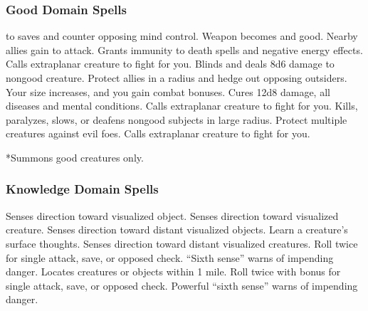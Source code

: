 \subsubsection{Good Domain Spells}

\begin{spelllist}
  \spellhead[1]{}
    to saves and counter opposing mind control.
   Weapon becomes  and good.
   Nearby allies gain  to attack.
   Grants immunity to death spells and negative energy effects.
   Calls extraplanar creature to fight for you.
  \spellhead[4]{}
   Blinds and deals 8d6 damage to nongood creature.
   Protect allies in a \areamed radius and hedge out opposing outsiders.
   Your size increases, and you gain combat bonuses.
   Cures 12d8 damage, all diseases and mental conditions.
   Calls extraplanar creature to fight for you.
  \F Kills, paralyzes, slows, or deafens nongood subjects in large radius.
  \spellhead[7]{}
  \spellhead[8]{}
   Protect multiple creatures against evil foes. 
  \spellhead[9]{}
   Calls extraplanar creature to fight for you.
\end{spelllist}
*Summons good creatures only.

\subsubsection{Knowledge Domain Spells}

\begin{spelllist}
   Senses direction toward visualized object.
  \spellhead[1]{}
   Senses direction toward visualized creature.
  \spellhead[2]{}
   Senses direction toward distant visualized objects.
   Learn a creature's surface thoughts.
   Senses direction toward distant visualized creatures.
   Roll twice for single attack, save, or opposed check.
   ``Sixth sense'' warns of impending danger.
  \spellhead[5]{}
   Locates creatures or objects within 1 mile.
  \spellhead[7]{}
   Roll twice with bonus for single attack, save, or opposed check.
  \spellhead[8]{}
  \spellhead[8]{}
   Powerful ``sixth sense'' warns of impending danger.
\end{spelllist}

